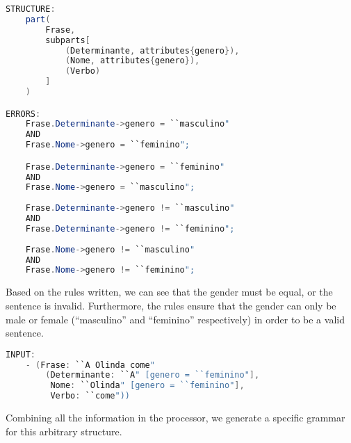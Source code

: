 \begin{center}
\begin{minipage}{10cm}
\begin{lstlisting}[language=java, basicstyle=\tiny, label={lst:arbitrary_structure}, caption=Example of an arbitrary sentence structure]
STRUCTURE:
    part(
        Frase,
        subparts[
            (Determinante, attributes{genero}),
            (Nome, attributes{genero}),
            (Verbo)
        ]
    )

ERRORS:
    Frase.Determinante->genero = ``masculino" 
    AND
    Frase.Nome->genero = ``feminino";

    Frase.Determinante->genero = ``feminino" 
    AND
    Frase.Nome->genero = ``masculino";
    
    Frase.Determinante->genero != ``masculino"
    AND 
    Frase.Determinante->genero != ``feminino";
    
    Frase.Nome->genero != ``masculino" 
    AND 
    Frase.Nome->genero != ``feminino";
\end{lstlisting}
\end{minipage}
\end{center}

Based on the rules written, we can see that the gender must be equal, or the sentence is invalid. Furthermore, the rules ensure that the gender can only be male or female (``masculino'' and ``feminino'' respectively) in order
to be a valid sentence.

\begin{center}
\begin{minipage}{10cm}
\begin{lstlisting}[language=java, basicstyle=\tiny, label={lst:arbitrary_structure_input}, caption=Example of an arbitrary sentence input]
INPUT:
    - (Frase: ``A Olinda come"
        (Determinante: ``A" [genero = ``feminino"],
         Nome: ``Olinda" [genero = ``feminino"],
         Verbo: ``come"))
\end{lstlisting}
\end{minipage}
\end{center}

Combining all the information in the processor, we generate a specific grammar for this arbitrary structure.

